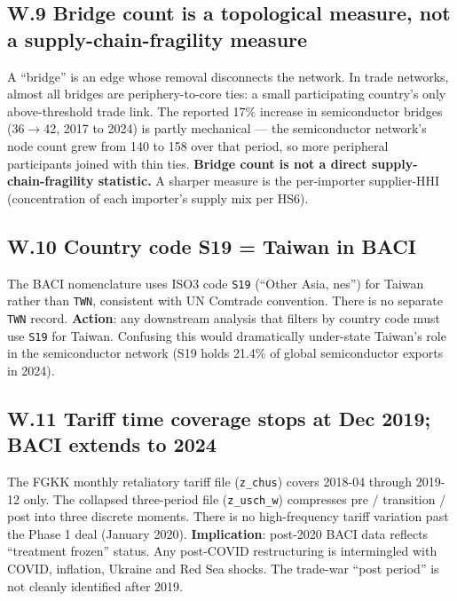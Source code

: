 \documentclass[11pt,a4paper]{article}
\begin{document}
\subsection*{W.9 Bridge count is a topological measure, not a
supply-chain-fragility measure}

\begin{warnbox}
A ``bridge'' is an edge whose removal disconnects the network. In trade
networks, almost all bridges are periphery-to-core ties: a small
participating country's only above-threshold trade link.
The reported 17\% increase in semiconductor bridges (36$\to$42, 2017
to 2024) is partly mechanical — the semiconductor network's node count
grew from 140 to 158 over that period, so more peripheral participants
joined with thin ties.
\textbf{Bridge count is not a direct supply-chain-fragility statistic.}
A sharper measure is the per-importer supplier-HHI (concentration of
each importer's supply mix per HS6).
\end{warnbox}

\subsection*{W.10 Country code S19 = Taiwan in BACI}

\begin{warnbox}
The BACI nomenclature uses ISO3 code \texttt{S19} (``Other Asia, nes'')
for Taiwan rather than \texttt{TWN}, consistent with UN Comtrade
convention. There is no separate \texttt{TWN} record.
\textbf{Action}: any downstream analysis that filters by country code
must use \texttt{S19} for Taiwan. Confusing this would dramatically
under-state Taiwan's role in the semiconductor network (S19 holds 21.4\%
of global semiconductor exports in 2024).
\end{warnbox}

\subsection*{W.11 Tariff time coverage stops at Dec 2019; BACI extends to 2024}

\begin{warnbox}
The FGKK monthly retaliatory tariff file (\texttt{z\_chus}) covers
2018-04 through 2019-12 only. The collapsed three-period file
(\texttt{z\_usch\_w}) compresses pre / transition / post into three
discrete moments. There is no high-frequency tariff variation past the
Phase 1 deal (January 2020).
\textbf{Implication}: post-2020 BACI data reflects ``treatment frozen''
status. Any post-COVID restructuring is intermingled with COVID,
inflation, Ukraine and Red Sea shocks. The trade-war ``post period''
is not cleanly identified after 2019.
\end{warnbox}
\end{document}
